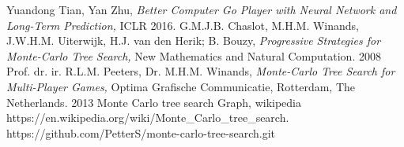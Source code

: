 \documentclass[9pt,twocolumn,twoside]{osajnl}
\begin{document}
\begin{thebibliography}{1}
Yuandong Tian, Yan Zhu, \emph{Better Computer Go Player with Neural Network and Long-Term Prediction,} ICLR 2016.
 G.M.J.B. Chaslot, M.H.M. Winands, J.W.H.M. Uiterwijk, H.J. van den Herik; B. Bouzy, \emph{Progressive Strategies for Monte-Carlo Tree Search, } New Mathematics and Natural Computation. 2008
Prof. dr. ir. R.L.M. Peeters, Dr. M.H.M. Winands, \emph{Monte-Carlo Tree Search for Multi-Player Games, } Optima Grafische Communicatie, Rotterdam, The Netherlands. 2013
 Monte Carlo tree search Graph, wikipedia https://en.wikipedia.org/wiki/Monte\_Carlo\_tree\_search.
 https://github.com/PetterS/monte-carlo-tree-search.git
\end{thebibliography}
\end{document}
